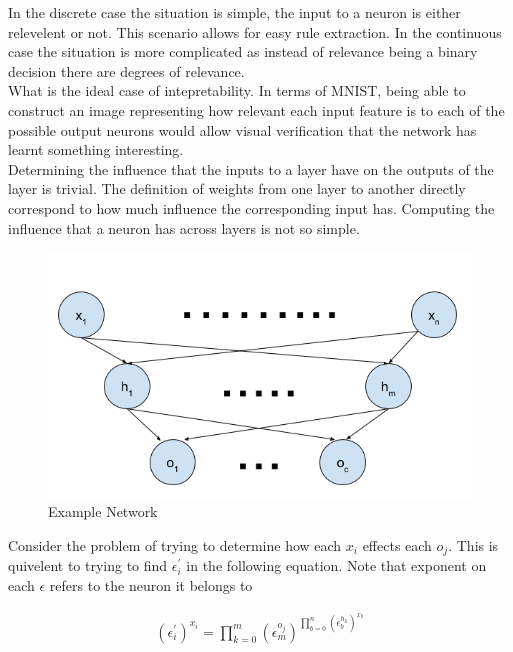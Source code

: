 In the discrete case the situation is simple, the input to a neuron is either relevelent or not. This scenario allows for easy rule extraction. In the continuous case the situation is more complicated as instead of relevance being a binary decision there are degrees of relevance.\\

What is the ideal case of intepretability. In terms of MNIST, being able to construct an image representing how relevant each input feature is to each of the possible output neurons would allow visual verification that the network has learnt something interesting.\\

Determining the influence that the inputs to a layer have on the outputs of the layer is trivial. The definition of weights from one layer to another directly correspond to how much influence the corresponding input has. Computing the influence that a neuron has across layers is not so simple.

\begin{figure}[H]
	\centering
	\begin{minipage}[b]{0.5\textwidth}
		\includegraphics[width=\textwidth]{NetworkExample.png}
		\caption{Example Network}
		\label{fig:network-example}
	\end{minipage}
	\hfill
\end{figure}

Consider the problem of trying to determine how each $x_i$ effects each $o_j$. This is quivelent to trying to find $\epsilon^{'}_i$ in the following equation. Note that exponent on each $\epsilon$ refers to the neuron it belongs to

\begin{align*}
	(\epsilon^{'}_i)^{x_i} = \prod_{k = 0}^{m} (\epsilon^{o_j}_m)^{\prod_{b = 0}^{n} (\epsilon^{h_k}_b)^{x_b}}
\end{align*}

